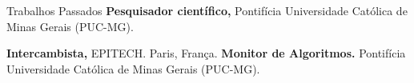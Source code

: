 \begin{rubric}{Trabalhos Passados}
\entry*[2020 -- 2023]%
    \textbf{Pesquisador científico,} Pontifícia Universidade Católica de Minas Gerais (PUC-MG).

\entry*[2023/1]%
    \textbf{Intercambista,} EPITECH. Paris, França.
%
%
\entry*[2022]%
    \textbf{Monitor de Algoritmos.} Pontifícia Universidade Católica de Minas Gerais (PUC-MG).
%
\end{rubric}
